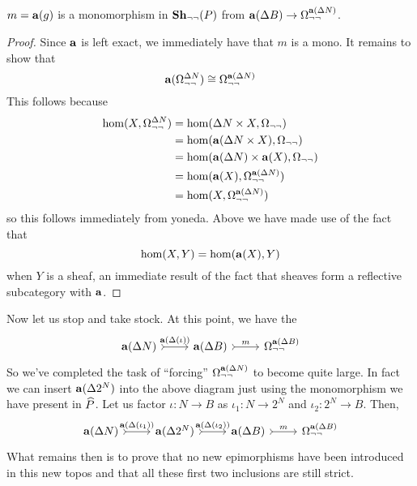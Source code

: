 \begin{cor}
  $m = \sheafify(g)$ is a monomorphism in $\sheaves[\neg\neg]{P}$ from
  $\sheafify(\Delta B) \to \Omega_{\neg\neg}^{\sheafify(\Delta N)}$.
\end{cor}
\begin{proof}
  Since $\sheafify$ is left exact, we immediately have that $m$ is a
  mono. It remains to show that
  \[
    \sheafify(\Omega_{\neg\neg}^{\Delta N}) \cong
    \Omega_{\neg\neg}^{\sheafify(\Delta N)}
  \]
  This follows because
  \begin{align*}
    \hom(X, \Omega_{\neg\neg}^{\Delta N}) &=
        \hom(\Delta N \times X, \Omega_{\neg\neg})\\
     &= \hom(\sheafify(\Delta N \times X), \Omega_{\neg\neg})\\
     &= \hom(\sheafify(\Delta N) \times \sheafify(X), \Omega_{\neg\neg})\\
     &= \hom(\sheafify(X), \Omega_{\neg\neg}^{\sheafify(\Delta N) })\\
     &= \hom(X, \Omega_{\neg\neg}^{\sheafify(\Delta N) })\\
  \end{align*}
  so this follows immediately from yoneda. Above we have made use of
  the fact that
  \[
    \hom(X, Y) = \hom(\sheafify(X), Y)
  \]
  when $Y$ is a sheaf, an immediate result of the fact that sheaves
  form a reflective subcategory with $\sheafify$.
\end{proof}

Now let us stop and take stock. At this point, we have the
\[
  \begin{tikzcd}
    \sheafify(\Delta N) \ar[r, rightarrowtail, "\sheafify(\Delta(\iota))"] &
    \sheafify(\Delta B)  \ar[r, rightarrowtail, "m"] &
    \Omega_{\neg\neg}^{\sheafify(\Delta B)}
  \end{tikzcd}
\]
So we've completed the task of ``forcing''
$\Omega_{\neg\neg}^{\sheafify(\Delta N)}$ to become quite large. In
fact we can insert $\sheafify(\Delta 2^N)$ into the above diagram
just using the monomorphism we have present in $\presheaf{P}$. Let us
factor $\iota : N \to B$ as $\iota_1 : N \to 2^N$ and
$\iota_2 : 2^N \to B$. Then,
\[
  \begin{tikzcd}
    \sheafify(\Delta N) \ar[r, rightarrowtail, "\sheafify(\Delta(\iota_1))"] &
    \sheafify(\Delta 2^N) \ar[r, rightarrowtail, "\sheafify(\Delta(\iota_2))"] &
    \sheafify(\Delta B) \ar[r, rightarrowtail, "m"] &
    \Omega_{\neg\neg}^{\sheafify(\Delta B)}
  \end{tikzcd}
\]
What remains then is to prove that no new epimorphisms have been
introduced in this new topos and that all these first two inclusions
are still strict.
